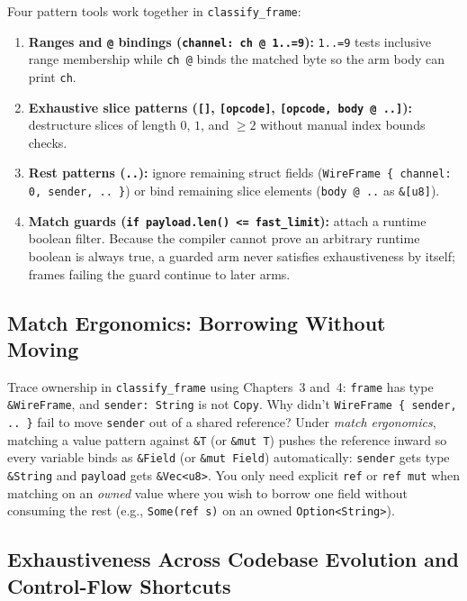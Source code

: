 Four pattern tools work together in \texttt{classify\_frame}:
\begin{enumerate}
  \item \textbf{Ranges and \texttt{@} bindings (\texttt{channel: ch @ 1..=9}):} \texttt{1..=9} tests inclusive range membership while \texttt{ch @} binds the matched byte so the arm body can print \texttt{ch}.
  \item \textbf{Exhaustive slice patterns (\texttt{[]}, \texttt{[opcode]}, \texttt{[opcode, body @ ..]}):} destructure slices of length $0$, $1$, and $\ge 2$ without manual index bounds checks.
  \item \textbf{Rest patterns (\texttt{..}):} ignore remaining struct fields (\texttt{WireFrame \{ channel: 0, sender, .. \}}) or bind remaining slice elements (\texttt{body @ ..} as \texttt{\&[u8]}).
  \item \textbf{Match guards (\texttt{if payload.len() <= fast\_limit}):} attach a runtime boolean filter. Because the compiler cannot prove an arbitrary runtime boolean is always true, a guarded arm never satisfies exhaustiveness by itself; frames failing the guard continue to later arms.
\end{enumerate}

\subsection{Match Ergonomics: Borrowing Without Moving}
\label{ch05:match-ergonomics}

Trace ownership in \texttt{classify\_frame} using Chapters~3 and~4: \texttt{frame} has type \texttt{\&WireFrame}, and \texttt{sender: String} is not \texttt{Copy}. Why didn't \texttt{WireFrame \{ sender, .. \}} fail to move \texttt{sender} out of a shared reference? Under \emph{match ergonomics}, matching a value pattern against \texttt{\&T} (or \texttt{\&mut T}) pushes the reference inward so every variable binds as \texttt{\&Field} (or \texttt{\&mut Field}) automatically: \texttt{sender} gets type \texttt{\&String} and \texttt{payload} gets \texttt{\&Vec<u8>}. You only need explicit \texttt{ref} or \texttt{ref mut} when matching on an \emph{owned} value where you wish to borrow one field without consuming the rest (e.g., \texttt{Some(ref s)} on an owned \texttt{Option<String>}).

\subsection{Exhaustiveness Across Codebase Evolution and Control-Flow Shortcuts}
\label{ch05:exhaustiveness}

